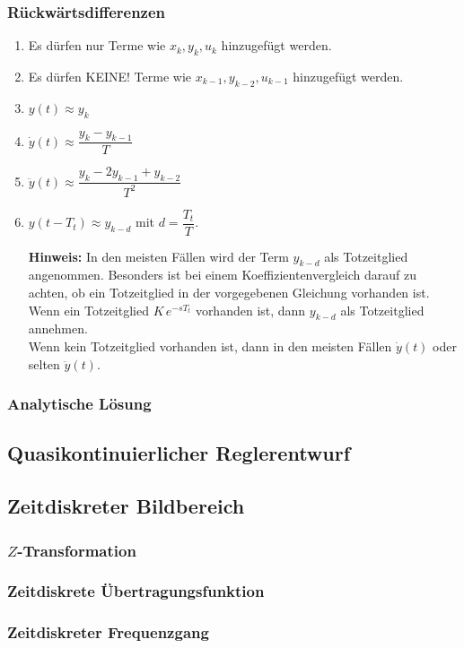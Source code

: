 \documentclass[12pt]{article}
\begin{document}
\subsubsection{Rückwärtsdifferenzen}
\begin{enumerate}[label=\arabic*.]
	\item Es dürfen nur Terme wie \(x_k, y_k, u_k\) hinzugefügt werden.
	\item Es dürfen KEINE! Terme wie \(x_{k-1}, y_{k-2}, u_{k-1}\) hinzugefügt werden.
	\item \(y(t) \approx y_k\)
	\item \(\dot{y}(t) \approx \dfrac{y_k - y_{k-1}}{T}\)
	\item \(\ddot{y}(t) \approx \dfrac{y_k - 2y_{k-1} + y_{k-2}}{T^2}\)
	\item \(y(t-T_t) \approx y_{k-d}\) mit \(d = \dfrac{T_t}{T}\).
	
	\textbf{Hinweis:} In den meisten Fällen wird der Term \(y_{k-d}\) als Totzeitglied angenommen. Besonders ist bei einem Koeffizientenvergleich darauf zu achten, ob ein Totzeitglied in der vorgegebenen Gleichung vorhanden ist.
	\\
	Wenn ein Totzeitglied \(K\,e^{-sT_t}\) vorhanden ist, dann \(y_{k-d}\) als Totzeitglied annehmen.
	\\
	Wenn kein Totzeitglied vorhanden ist, dann in den meisten Fällen \(\dot{y}(t)\) oder selten \(\ddot{y}(t)\).
\end{enumerate}

\subsubsection{Analytische Lösung}
\subsection{Quasikontinuierlicher Reglerentwurf}
\subsection{Zeitdiskreter Bildbereich}
\subsubsection{\(Z\)-Transformation}
\subsubsection{Zeitdiskrete Übertragungsfunktion}
\subsubsection{Zeitdiskreter Frequenzgang}
\end{document}
